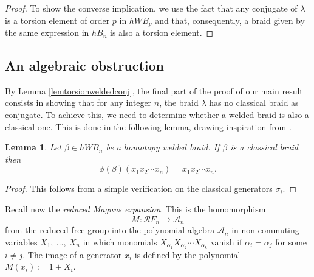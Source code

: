 \documentclass[11pt, a4paper, twoside,reqno]{amsart}
\theoremstyle{plain}
\newtheorem{lem}[thm]{Lemma}
\theoremstyle{definition}
\theoremstyle{remark}
\begin{document}
\begin{proof}
To show the converse implication, we use the fact that any conjugate of $\lambda$ is a torsion element of order $p$ in $hWB_p$ and that, consequently, a braid given by the same expression in $hB_n$ is also a torsion element.
\end{proof}

\subsection{An algebraic obstruction}
By Lemma \ref{lemtorsionweldedconj}, the final part of the proof of our main result consists in showing that for any integer $n$, the braid $\lambda$ has no classical braid as conjugate. To achieve this, we need to determine whether a welded braid is also a classical one. This is done in the following lemma, drawing inspiration from \cite[Thm. 1.7]{HabeggerLinHomotopy}.
\begin{lem}\label{lemclassicalcara}
Let $\beta\in hWB_n$ be a homotopy welded braid. If $\beta$ is a classical braid then $$\phi(\beta)(x_1x_2\cdots x_n)=x_1x_2\cdots x_n.$$
\end{lem}
\begin{proof}
This follows from a simple verification on the classical generators $\sigma_i$.
\end{proof}

Recall now the \emph{reduced Magnus expansion}. This is the homomorphism \[M: \mathcal RF_n\to \mathcal A_n\] from the reduced free group into the polynomial algebra $\mathcal A_n$ in non-commuting variables $X_1,\ \ldots,\ X_n$ in which monomials $X_{\alpha_1}X_{\alpha_2}\cdots X_{\alpha_k}$ vanish if $\alpha_i=\alpha_j$ for some $i\neq j$. The image of a generator $x_i$ is defined by the polynomial $M(x_i):=1+X_i$. 
\end{document}
